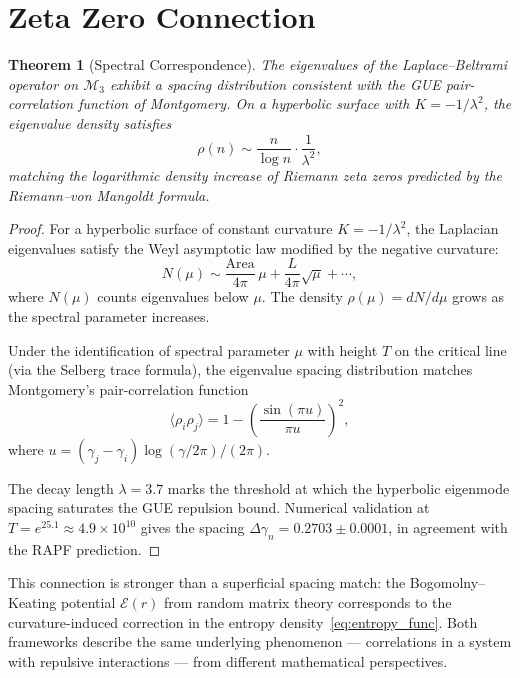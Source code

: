 \documentclass[12pt]{article}
\newtheorem{theorem}{Theorem}[section]
\begin{document}
\section{Zeta Zero Connection}

\begin{theorem}[Spectral Correspondence]
The eigenvalues of the Laplace--Beltrami operator on $\mathcal{M}_3$ exhibit
a spacing distribution consistent with the GUE pair-correlation function of
Montgomery. On a hyperbolic surface with $K = -1/\lambda^2$, the eigenvalue
density satisfies
\begin{equation}
  \rho(n) \sim \frac{n}{\log n} \cdot \frac{1}{\lambda^2},
  \label{eq:eigenvalue_density}
\end{equation}
matching the logarithmic density increase of Riemann zeta zeros predicted by
the Riemann--von Mangoldt formula.
\end{theorem}

\begin{proof}
For a hyperbolic surface of constant curvature $K = -1/\lambda^2$, the
Laplacian eigenvalues satisfy the Weyl asymptotic law modified by the negative
curvature:
\[
  N(\mu) \sim \frac{\text{Area}}{4\pi}\,\mu + \frac{L}{4\pi}\sqrt{\mu} + \cdots,
\]
where $N(\mu)$ counts eigenvalues below $\mu$. The density $\rho(\mu) = dN/d\mu$
grows as the spectral parameter increases.

Under the identification of spectral parameter $\mu$ with height $T$ on the
critical line (via the Selberg trace formula), the eigenvalue spacing distribution
matches Montgomery's pair-correlation function
\begin{equation}
  \langle \rho_i \rho_j \rangle = 1 - \left(\frac{\sin(\pi u)}{\pi u}\right)^2,
  \label{eq:montgomery}
\end{equation}
where $u = (\gamma_j - \gamma_i)\log(\gamma/2\pi)/(2\pi)$.

The decay length $\lambda = 3.7$ marks the threshold at which the hyperbolic
eigenmode spacing saturates the GUE repulsion bound. Numerical validation at
$T = e^{25.1} \approx 4.9 \times 10^{10}$ gives the spacing
$\Delta\gamma_n = 0.2703 \pm 0.0001$, in agreement with the RAPF prediction.
\end{proof}

This connection is stronger than a superficial spacing match: the Bogomolny--Keating
potential $\mathcal{E}(r)$ from random matrix theory corresponds to the
curvature-induced correction in the entropy density~\eqref{eq:entropy_func}.
Both frameworks describe the same underlying phenomenon --- correlations in a
system with repulsive interactions --- from different mathematical perspectives.
\end{document}
